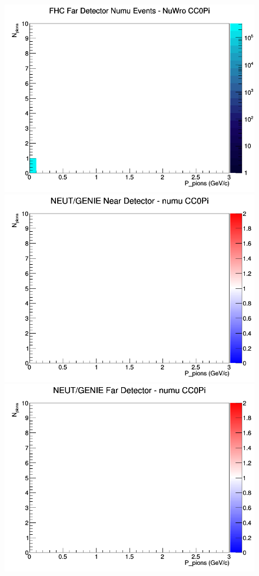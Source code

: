 \documentclass[12pt]{article}
\begin{document}
\begin{figure}[h]
\endminipage
{}
\includegraphics[width=\linewidth]{N_P/nominal/pions/CC0Pi_FHC_FD_numu_N_P_NuWro.png}
\endminipage
\newline
{}
\includegraphics[width=\linewidth]{N_P/nominal/pions/ratios/CC0Pi_NEUT_GENIE_numu_near_N_P.png}
\endminipage
{}
\includegraphics[width=\linewidth]{N_P/nominal/pions/ratios/CC0Pi_NEUT_GENIE_numu_far_N_P.png}

\end{figure}
\end{document}
